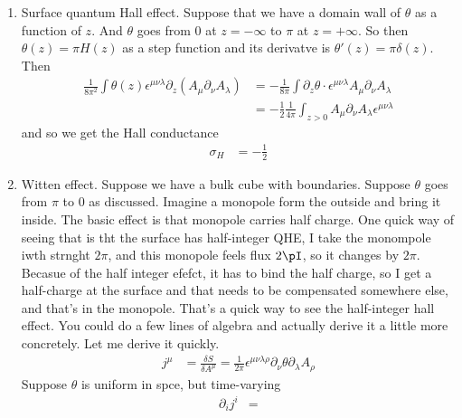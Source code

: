 \begin{enumerate}
    \item Surface quantum Hall effect.
        Suppose that we have a domain wall of $\theta$ as a function of $z$.
        And $\theta$ goes from $0$ at $z=-\infty$ to $\pi$ at $z=+\infty$.
        So then
        $\theta(z)=\pi H(z)$ as a step function and its derivatve is
        $\theta'(z) = \pi \delta(z)$.
        Then
        \begin{align}
            \frac{1}{8\pi^2}\int\theta(z)
            \epsilon^{\mu\nu\lambda}\partial_z\left( 
            A_\mu \partial_\nu A_\lambda
            \right)
            &= -\frac{1}{8\pi}\int \partial_z\theta\cdot
            \epsilon^{\mu\nu\lambda} A_\mu \partial_\nu A_\lambda\\
            &= -\frac{1}{2} \frac{1}{4\pi}\int_{z>0}
            A_\mu \partial_\nu A_\lambda \epsilon^{\mu\nu\lambda}
        \end{align}
        and so we get the Hall conductance
        \begin{align}
            \sigma_H &= -\frac{1}{2}
        \end{align}
    \item Witten effect.
        Suppose we have a bulk cube with boundaries.
        Suppose $\theta$ goes from $\pi$ to $0$ as discussed.
        Imagine a monopole form the outside and bring it inside.
        The basic effect is that monopole carries half charge.
        One quick way of seeing that is tht the surface has half-integer QHE,
        I take the monompole iwth strnght $2\pi$,
        and this monopole feels flux $2\pI$,
        so it changes by $2\pi$.
        Becasue of the half integer efefct,
        it has to bind the half charge,
        so I get a half-charge at the surface and that needs to be compensated
        somewhere else,
        and that's in the monopole.
        That's a quick way to see the half-integer hall effect.
        You could do a few lines of algebra and actually derive it a little more
        concretely.
        Let me derive it quickly.
        \begin{align}
            j^{\mu} &=
            \frac{\delta S}{\delta A^{\mu}} =
            \frac{1}{2\pi} \epsilon^{\mu\nu\lambda\rho}
            \partial_\nu \theta
            \partial_\lambda A_\rho
        \end{align}
        Suppose $\theta$ is uniform in spce,
        but time-varying
        \begin{align}
            \partial_i j^i &=

\end{align}
\end{enumerate}
